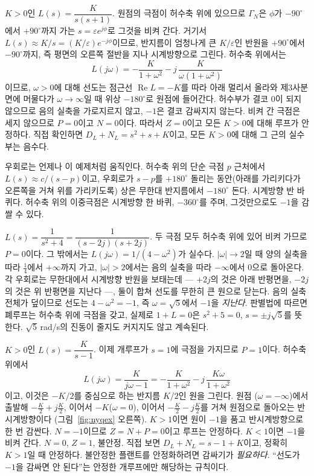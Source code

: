 \documentclass[11pt]{article}
\begin{document}
\begin{example}[루프 안의 적분기]\label{ex:nyq2}
$K>0$인 $L(s)=\dfrac{K}{s(s+1)}$. 원점의 극점이 허수축 위에 있으므로 $\Gamma_N$은
$\phi$가 $-90^\circ$에서 $+90^\circ$까지 가는 $s=\varepsilon e^{j\phi}$로 그것을
비켜 간다. 거기서 $L(s)\approx K/s = (K/\varepsilon)e^{-j\phi}$이므로, 반지름이
엄청나게 큰 $K/\varepsilon$인 반원을 $+90^\circ$에서 $-90^\circ$까지, 즉 평면의
오른쪽 절반을 지나 시계방향으로 그린다. 허수축 위에서는
\[
   L(j\omega) = -\frac{K}{1+\omega^{2}} - j\,\frac{K}{\omega(1+\omega^{2})}
\]
이므로, $\omega>0$에 대해 선도는 점근선 $\operatorname{Re}L=-K$를 따라 아래
멀리서 올라와 제3사분면에 머물다가 $\omega\to\infty$일 때 위상 $-180^\circ$로
원점에 들어간다. 허수부가 결코 0이 되지 않으므로 음의 실축을 가로지르지 않고,
$-1$은 결코 감싸지지 않는다. 비켜 간 극점은 세지 않으므로 $P=0$이고 $N=0$이다.
따라서 $Z=0$이고 모든 $K>0$에 대해 루프가 안정하다. 직접 확인하면
$D_L+N_L=s^{2}+s+K$이고, 모든 $K>0$에 대해 그 근의 실수부는 음수다.
\end{example}

우회로는 언제나 이 예제처럼 움직인다. 허수축 위의 단순 극점 $p$ 근처에서
$L(s)\approx c/(s-p)$이고, 우회로가 $s-p$를 $+180^\circ$ 돌리는 동안(아래를
가리키다가 오른쪽을 거쳐 위를 가리키도록) 상은 무한대 반지름에서 $-180^\circ$
돈다. 시계방향 반 바퀴다. 허수축 위의 이중극점은 시계방향 한 바퀴,
$-360^\circ$를 주며, 그것만으로도 $-1$을 감쌀 수 있다.

\begin{example}[허수축 위의 극점 쌍]\label{ex:nyq4}
$L(s)=\dfrac{1}{s^{2}+4}=\dfrac{1}{(s-2j)(s+2j)}$. 두 극점 모두 허수축 위에 있어
비켜 가므로 $P=0$이다. 그 밖에서는 $L(j\omega)=1/(4-\omega^{2})$가 실수다.
$|\omega|\to2$일 때 양의 실축을 따라 $\tfrac14$에서 $+\infty$까지 가고,
$|\omega|>2$에서는 음의 실축을 따라 $-\infty$에서 $0$으로 돌아온다. 각 우회로는
무한대에서 시계방향 반원을 보태는데 --- $+2j$의 것은 아래 반평면을, $-2j$의 것은
위 반평면을 지난다 ---, 둘이 합쳐 선도를 무한히 큰 원으로 닫는다. 음의 실축
전체가 덮이므로 선도는 $4-\omega^{2}=-1$, 즉 $\omega=\sqrt5$에서 $-1$을
\emph{지난다}. 판별법에 따르면 폐루프는 허수축 위에 극점을 갖고, 실제로 $1+L=0$은
$s^{2}+5=0$, $s=\pm j\sqrt5$를 뜻한다. $\sqrt5$\,rad/s의 진동이 줄지도 커지지도
않고 계속된다.
\end{example}

\begin{example}\label{ex:nyq3}
$K>0$인 $L(s)=\dfrac{K}{s-1}$. 이제 개루프가 $s=1$에 극점을 가지므로 $P=1$이다.
허수축 위에서
\[
   L(j\omega) = \frac{K}{j\omega-1}
   = -\frac{K}{1+\omega^{2}} - j\,\frac{K\omega}{1+\omega^{2}}
\]
이고, 이것은 $-K/2$를 중심으로 하는 반지름 $K/2$인 원을 그린다. 원점
($\omega=-\infty$)에서 출발해 $-\tfrac K2+j\tfrac K2$, 이어서 $-K$($\omega=0$),
이어서 $-\tfrac K2-j\tfrac K2$를 거쳐 원점으로 돌아오는 반시계방향이다
(그림~\ref{fig:nyqex} 오른쪽). $K>1$이면 원이 $-1$을 품고 반시계방향으로 한 번
감싼다. $N=-1$이므로 $Z=N+P=0$이고 루프는 안정하다. $K<1$이면 $-1$을 비켜 간다.
$N=0$, $Z=1$, 불안정. 직접 보면 $D_L+N_L=s-1+K$이고, 정확히 $K>1$일 때 안정하다.
불안정한 플랜트를 안정화하려면 감싸기가 \emph{필요하다}. ``선도가 $-1$을 감싸면
안 된다''는 안정한 개루프에만 해당하는 규칙이다.
\end{example}
\end{document}
